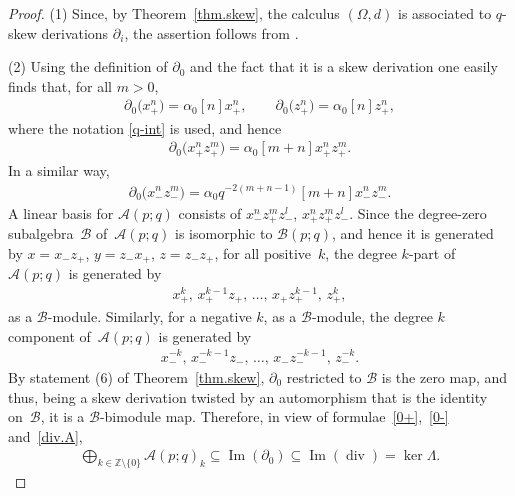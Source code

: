 \documentclass[10pt,a4paper]{amsart}
\numberwithin{equation}{section}
\def\Weyl#1#2{{\mathcal{B}}(#1;#2)}
\def\AWeyl#1#2{{\mathcal{A}}(#1;#2)}
\begin{document}
\begin{proof}
(1) Since, by Theorem~\ref{thm.skew}, the calculus $(\Omega ,d)$ is associated to $q$-skew derivations $\partial_i$, the assertion follows from \cite[Theorem~3.4]{BrzElK:int}.

(2) Using the def\/inition of $\partial_0$ and the fact that it is a skew derivation one easily f\/inds that, for all $m >0$,
\begin{gather*}
\partial_0\big(x_+^n\big) = \alpha_0 [n] x_+^n, \qquad \partial_0\big(z_+^n\big) = \alpha_0 [n] z_+^n,
\end{gather*}
where the notation \eqref{q-int} is used, and hence
\begin{gather}\label{0+}
\partial_0\big(x_+^nz_+^m\big) = \alpha_0 [m+n] x_+^nz_+^m.
\end{gather}
In a similar way,
\begin{gather}\label{0-}
\partial_0\big(x_-^nz_-^m\big) = \alpha_0 q^{-2(m+n-1)} [m+n] x_-^nz_-^m.
\end{gather}
A linear basis for $\AWeyl p q$ consists of $x_-^nz_+^mz_-^l$, $x_+^nz_+^mz_-^l$. Since the degree-zero subalgebra~${\mathcal{B}}$ of~$\AWeyl p q$ is isomorphic to $\Weyl p q$, and hence it is generated by $x=x_-z_+$, $y = z_-x_+$, $z=z_-z_+$, for all positive~$k$, the degree $k$-part of $\AWeyl p q$ is generated by
\begin{gather*}
x_+^k, \,x_+^{k-1}z_+,\, \ldots ,\, x_+z_+^{k-1},\, z_+^k,
\end{gather*}
as a ${\mathcal{B}}$-module. Similarly, for a negative $k$, as a ${\mathcal{B}}$-module, the degree $k$ component of~$\AWeyl p q$ is generated by
\begin{gather*}
x_-^{-k},\, x_-^{-k-1}z_-, \,\ldots ,\, x_-z_-^{-k-1},\, z_-^{-k}.
\end{gather*}
By statement (6) of Theorem~\ref{thm.skew}, $\partial_0$ restricted to ${\mathcal{B}}$ is the zero map, and thus, being a skew derivation twisted by an automorphism that is the identity on~${\mathcal{B}}$, it is a ${\mathcal{B}}$-bimodule map. Therefore, in view of formulae~\eqref{0+},~\eqref{0-} and~\eqref{div.A},
\begin{gather}\label{not0}
\bigoplus_{k\in {\mathbb Z}\setminus \{0\}} \AWeyl p q _k \subseteq \operatorname{Im} (\partial_0 )\subseteq \operatorname{Im} (\operatorname{div} )= \ker \Lambda.
\end{gather}


\end{proof}
\end{document}
